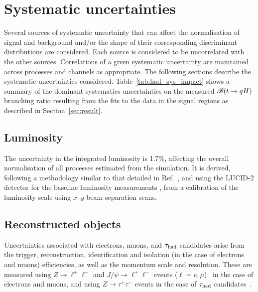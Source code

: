 \documentclass[PAPER, coverpage, atlasdraft=true, texlive=2016, UKenglish]{\ATLASLATEXPATH atlasdoc} %
\begin{document}
\section{Systematic uncertainties}
\label{sec:systematics}

Several sources of systematic uncertainty that can affect the normalisation of signal 
and background and/or the shape of their corresponding discriminant distributions are considered.
Each source is considered to be uncorrelated with the other sources.  
Correlations of a given systematic uncertainty are maintained across processes and channels 
as appropriate. The following sections describe the systematic uncertainties considered.
Table~\ref{tab:had_sys_impact} shows a summary of the dominant systematics uncertainties on the measured $\mathscr{B}(t\to qH)$ branching ratio
resulting from the fits to the data in the signal regions as described in Section~\ref{sec:result}.

\subsection{Luminosity}
\label{sec:syst_lumi}

The uncertainty in the integrated luminosity is 1.7\%, affecting the overall normalisation of all processes estimated from the simulation. 
It is derived, following a methodology similar to that detailed in Ref.~\cite{Aaboud:2016hhf}, and using the LUCID-2 detector 
for the baseline luminosity measurements \cite{Avoni:2018iuv}, from a calibration of the luminosity scale using $x$--$y$ beam-separation scans.

\subsection{Reconstructed objects}
\label{sec:syst_objects}

Uncertainties associated with electrons, muons, and $\tau_{\mathrm{had}}$ candidates arise from the trigger, reconstruction,  
identification and isolation (in the case of electrons and muons) efficiencies, as well as the momentum scale and resolution. 
These are measured using $Z\to \ell^+\ell^-$ and $J/\psi\to \ell^+\ell^-$ events ($\ell =e, \mu$)~\cite{ATLAS-CONF-2016-024,Aad:2016jkr} 
in the case of electrons and muons, and using $Z\to \tau^+\tau^-$ events in the case of $\tau_{\mathrm{had}}$ candidates~\cite{ATLAS-CONF-2017-029}.
\end{document}
